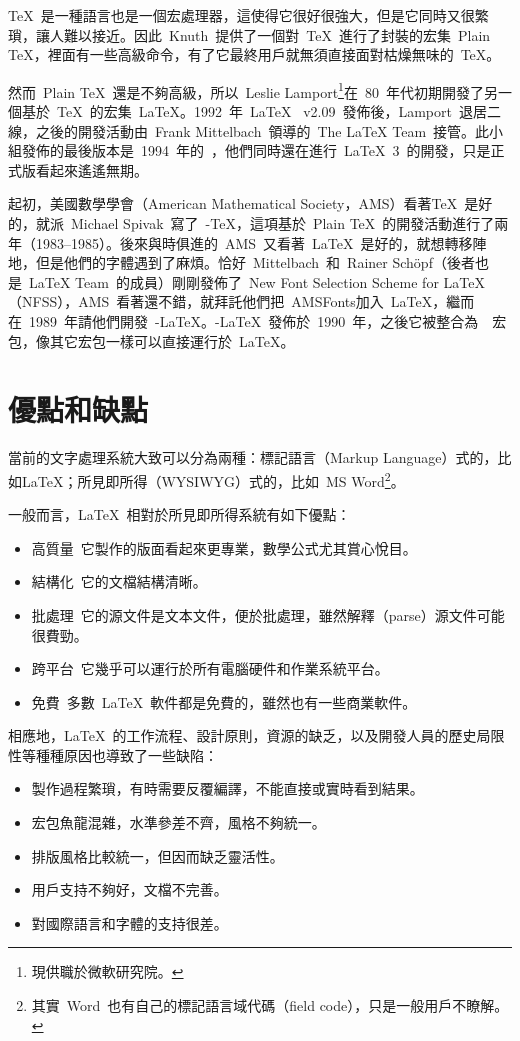 \TeX~是一種語言也是一個宏處理器，這使得它很好很強大，但是它同時又很繁瑣，讓人難以接近。因此~Knuth~提供了一個對~\TeX~進行了封裝的宏集~Plain \TeX，裡面有一些高級命令，有了它最終用戶就無須直接面對枯燥無味的~\TeX。

然而~Plain \TeX~還是不夠高級，所以~Leslie Lamport\footnote{現供職於微軟研究院。}在~80~年代初期開發了另一個基於~\TeX~的宏集~\LaTeX。1992~年~\LaTeX~ v2.09~發佈後，Lamport~退居二線，之後的開發活動由~Frank Mittelbach~領導的~The LaTeX Team~接管。此小組發佈的最後版本是~1994~年的~\LaTeXe，他們同時還在進行~\LaTeX~3~的開發，只是正式版看起來遙遙無期。

起初，美國數學學會（American Mathematical Society，AMS）看著\TeX~是好的，就派~Michael Spivak~寫了~\AmS-\TeX，這項基於~Plain \TeX~的開發活動進行了兩年（1983--1985）。後來與時俱進的~AMS~又看著~\LaTeX~是好的，就想轉移陣地，但是他們的字體遇到了麻煩。恰好~Mittelbach~和~Rainer Schöpf（後者也是~LaTeX Team~的成員）剛剛發佈了~New Font Selection Scheme for \LaTeX（NFSS），AMS~看著還不錯，就拜託他們把~AMSFonts加入~\LaTeX，繼而在~1989~年請他們開發~\AmS-\LaTeX。\AmS-\LaTeX~發佈於~1990~年，之後它被整合為~\AmS~宏包，像其它宏包一樣可以直接運行於~\LaTeX。

\section{優點和缺點}
當前的文字處理系統大致可以分為兩種：標記語言（Markup Language）式的，比如\LaTeX；所見即所得（WYSIWYG）式的，比如~MS Word\footnote{其實~Word~也有自己的標記語言域代碼（field code），只是一般用戶不瞭解。}。

一般而言，\LaTeX~相對於所見即所得系統有如下優點：
\begin{itemize}
    \item 高質量\ 它製作的版面看起來更專業，數學公式尤其賞心悅目。
    \item 結構化\ 它的文檔結構清晰。
    \item 批處理\ 它的源文件是文本文件，便於批處理，雖然解釋（parse）源文件可能很費勁。
    \item 跨平台\ 它幾乎可以運行於所有電腦硬件和作業系統平台。
    \item 免費\ 多數~\LaTeX~軟件都是免費的，雖然也有一些商業軟件。
\end{itemize}

相應地，\LaTeX~的工作流程、設計原則，資源的缺乏，以及開發人員的歷史局限性等種種原因也導致了一些缺陷：
\begin{itemize}
    \item 製作過程繁瑣，有時需要反覆編譯，不能直接或實時看到結果。
    \item 宏包魚龍混雜，水準參差不齊，風格不夠統一。
    \item 排版風格比較統一，但因而缺乏靈活性。
    \item 用戶支持不夠好，文檔不完善。
    \item 對國際語言和字體的支持很差。
\end{itemize}

